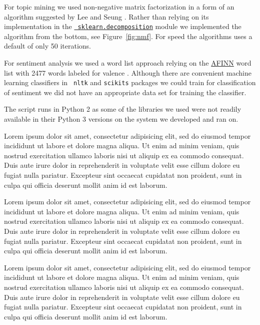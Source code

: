 \documentclass[10pt]{IEEEtran}
\begin{document}
For topic mining we used non-negative matrix factorization in a form
of an algorithm suggested by Lee and Seung
\cite{LeeDaniel2001Algorithms}. 
Rather than relying on its implementation in the
\href{http://scikit-learn.org/dev/modules/generated/sklearn.decomposition.NMF.html}{\tt
  sklearn.decomposition} 
module we implemented the algorithm from the bottom, see Figure~\ref{fig:nmf}. 
For speed the algorithms uses a default of only 50 iterations.

For sentiment analysis we used a word list approach relying on the
\href{http://www2.imm.dtu.dk/pubdb/views/publication_details.php?id=6010}{AFINN}
word list with 2477 words labeled for valence \cite{NielsenF2011New}.  
Although there are convenient machine learning classifiers in {\tt
  nltk} and {\tt scikits} packages we could train for classification
of sentiment we did not have an appropriate data set for training the
classifier. 


The script runs in Python 2 as some of the libraries we used were not
readily available in their Python 3 versions on the system we developed
and ran on. 



Lorem ipsum dolor sit amet, consectetur adipisicing elit, sed do
eiusmod tempor incididunt ut labore et dolore magna aliqua. Ut enim ad
minim veniam, quis nostrud exercitation ullamco laboris nisi ut
aliquip ex ea commodo consequat. Duis aute irure dolor in
reprehenderit in voluptate velit esse cillum dolore eu fugiat nulla
pariatur. Excepteur sint occaecat cupidatat non proident, sunt in
culpa qui officia deserunt mollit anim id est laborum.

Lorem ipsum dolor sit amet, consectetur adipisicing elit, sed do
eiusmod tempor incididunt ut labore et dolore magna aliqua. Ut enim ad
minim veniam, quis nostrud exercitation ullamco laboris nisi ut
aliquip ex ea commodo consequat. Duis aute irure dolor in
reprehenderit in voluptate velit esse cillum dolore eu fugiat nulla
pariatur. Excepteur sint occaecat cupidatat non proident, sunt in
culpa qui officia deserunt mollit anim id est laborum.

Lorem ipsum dolor sit amet, consectetur adipisicing elit, sed do
eiusmod tempor incididunt ut labore et dolore magna aliqua. Ut enim ad
minim veniam, quis nostrud exercitation ullamco laboris nisi ut
aliquip ex ea commodo consequat. Duis aute irure dolor in
reprehenderit in voluptate velit esse cillum dolore eu fugiat nulla
pariatur. Excepteur sint occaecat cupidatat non proident, sunt in
culpa qui officia deserunt mollit anim id est laborum.
\end{document}
